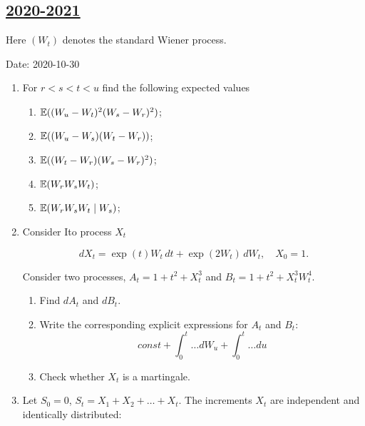 \subsection[2020-2021]{\hyperref[sec:sol_kr_01_2020_2021]{2020-2021}}
\label{sec:kr_01_2020_2021} %



Here $(W_t)$ denotes the standard Wiener process.

Date: 2020-10-30

\begin{enumerate}
    
    
    
    \item For $r<s<t<u$ find the following expected values 
    \begin{enumerate}
    \item $\operatorname{\mathbb{E}}((W_u - W_t)^2(W_s - W_r)^2)$;
    \item $\operatorname{\mathbb{E}}((W_u - W_s)(W_t - W_r))$;
    \item $\operatorname{\mathbb{E}}((W_t - W_r)(W_s - W_r)^2)$;
    \item $\operatorname{\mathbb{E}}(W_r W_s W_t)$;
    \item $\operatorname{\mathbb{E}}(W_r W_s W_t \mid W_s)$;
    \end{enumerate}

\item Consider Ito process $X_t$

\[
dX_t = \exp(t) W_t\, dt + \exp(2W_t) \, dW_t, \quad X_0 = 1.
\]

Consider two processes, $A_t = 1 + t^2 + X_t^3$ and $B_t = 1 + t^2 + X_t^3 W_t^4$.

\begin{enumerate}
    \item Find $dA_t$ and $dB_t$.
    \item Write the corresponding explicit expressions for $A_t$ and $B_t$:
    \[
    const + \int_0^t \ldots dW_u + \int_0^t \ldots du
    \]
    \item Check whether $X_t$ is a martingale.
\end{enumerate}

\item Let $S_0 = 0$, $S_t = X_1 + X_2 + \ldots + X_t$. The increments $X_t$ are independent and identically distributed: 


\end{enumerate}
